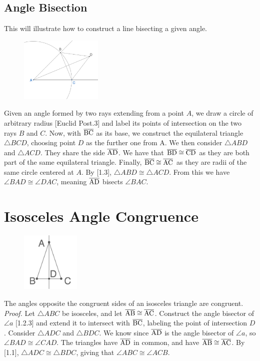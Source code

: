 \documentclass{report}
\begin{document}
\subsection{Angle Bisection}
This will illustrate how to construct a line bisecting a given angle.
\\[\baselineskip]
\begin{figure} %
    \centering
    \includegraphics[width=0.35\textwidth]{angbisector}
\end{figure}
Given an angle formed by two rays extending from a point $A$, we draw a circle of arbitrary radius [Euclid Post.\@ 3] and label its points of intersection on the two rays $B$ and $C$. Now, with $\overline{\rm BC}$ as its base, we construct the equilateral triangle $\triangle{BCD}$, choosing point $D$ as the further one from A. We then consider $\triangle{ABD}$ and $\triangle{ACD}$. They share the side $\overline{\rm AD}$. We have that $\overline{\rm BD} \cong \overline{\rm CD}$ as they are both part of the same equilateral triangle. Finally, $\overline{\rm BC} \cong \overline{\rm AC}$ as they are radii of the same circle centered at $A$. By [1.3], $\triangle{ABD} \cong\triangle{ACD}$. From this we have $\angle BAD \cong \angle DAC$, meaning $\overline{\rm AD}$ bisects $\angle BAC$.
\section{Isosceles Angle Congruence}
\begin{figure} %
    \centering
    \includegraphics[width=0.25\textwidth]{ISOC}
\end{figure}
The angles opposite the congruent sides of an isosceles triangle are congruent.
\\[\baselineskip]
\textit{Proof.} Let $\triangle{ABC}$ be isosceles, and let $\overline{\rm AB} \cong \overline{\rm AC}$. Construct the angle bisector of $\angle a$ [1.2.3] and extend it to intersect with $\overline{\rm BC}$, labeling the point of intersection $D$. Consider $\triangle{ADC}$ and $\triangle{BDC}$. We know since $\overline{\rm AD}$ is the angle bisector of $\angle a$, so $\angle BAD \cong \angle CAD$. The triangles have $\overline{\rm AD}$ in common, and have $\overline{\rm AB} \cong \overline{\rm AC}$. By [1.1], $\triangle{ADC} \cong \triangle{BDC}$, giving that $\angle ABC \cong \angle ACB$.
\end{document}
